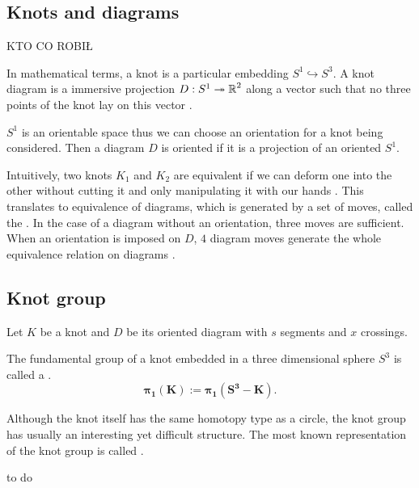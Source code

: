 \subsection{Knots and diagrams}

{\large\color{red}KTO CO ROBIŁ}

In mathematical terms, a knot is a particular embedding $S^1\hookrightarrow S^3$. A knot diagram is a {\color{blue}immersive projection} $D:S^1\twoheadrightarrow \operatorname{\mathbb{R}}^2$ along a vector such that no three points of the knot lay on this vector \cite{likorish-diagram}.

$S^1$ is an orientable space thus we can choose an orientation for a knot being considered. Then a diagram $D$ is oriented if it is a projection of an oriented $S^1$.

Intuitively, two knots $K_1$ and $K_2$ are equivalent if we can deform one into the other without cutting it and only manipulating it with our hands \cite{murasagi-equivalence}. This translates to equivalence of diagrams, which is generated by a set of moves, called the . In the case of a diagram without an orientation, three moves are sufficient. When an orientation is imposed on $D$, $4$ diagram moves generate the whole equivalence relation on diagrams \cite{ruchy_zorientowane}.

\subsection{Knot group}

Let $K$ be a knot and $D$ be its oriented diagram with $s$ segments and $x$ crossings. 
\begin{definition} 
  The fundamental group of a knot embedded in a three dimensional sphere $S^3$ is called a .
  $$\mathbf{\pi_1(K):=\pi_1(S^3-K)}.
  $$
\end{definition}
Although the knot itself has the same homotopy type as a circle, the knot group has usually an interesting yet difficult structure. The most known representation of the knot group is called .

\begin{definition}
  {\large\color{red}to do}
\end{definition}

